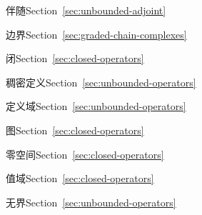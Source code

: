 \par\noindent\hspace*{1em}\label{index:operator-adjoint}{伴随}\quad Section~\ref{sec:unbounded-adjoint}

\par\noindent\hspace*{1em}\label{index:operator-boundary}{边界}\quad Section~\ref{sec:graded-chain-complexes}

\par\noindent\hspace*{1em}\label{index:operator-closed}{闭}\quad Section~\ref{sec:closed-operators}

\par\noindent\hspace*{1em}\label{index:operator-densely-defined}{稠密定义}\quad Section~\ref{sec:unbounded-operators}

\par\noindent\hspace*{1em}\label{index:operator-domain-of}{定义域}\quad Section~\ref{sec:unbounded-operators}

\par\noindent\hspace*{1em}\label{index:operator-graph}{图}\quad Section~\ref{sec:closed-operators}

\par\noindent\hspace*{1em}\label{index:operator-null-space}{零空间}\quad Section~\ref{sec:closed-operators}

\par\noindent\hspace*{1em}\label{index:operator-range}{值域}\quad Section~\ref{sec:closed-operators}

\par\noindent\hspace*{1em}\label{index:operator-unbounded}{无界}\quad Section~\ref{sec:unbounded-operators}

